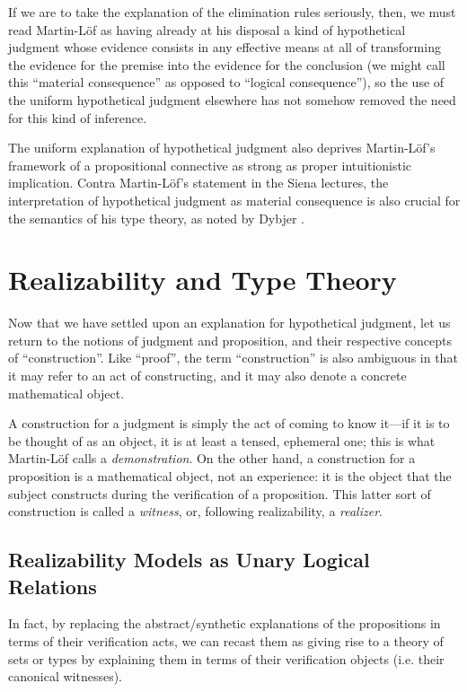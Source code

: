 \documentclass[11pt]{amsart}
\theoremstyle{definition}
\theoremstyle{remark}
\numberwithin{equation}{section}
\begin{document}
If we are to take the explanation of the elimination rules seriously, then, we
must read Martin-L\"of as having already at his disposal a kind of hypothetical
judgment whose evidence consists in any effective means at all of transforming
the evidence for the premise into the evidence for the conclusion (we might call
this ``material consequence'' as opposed to ``logical consequence''), so the use
of the uniform hypothetical judgment elsewhere has not somehow removed the need
for this kind of inference.

The uniform explanation of hypothetical judgment also deprives Martin-L\"of's
framework of a propositional connective as strong as proper intuitionistic
implication. Contra Martin-L\"of's statement in the Siena lectures, the
interpretation of hypothetical judgment as material consequence is also crucial
for the semantics of his type theory, as noted by Dybjer \cite{dybjer:testing}.

\section{Realizability and Type Theory}

Now that we have settled upon an explanation for hypothetical judgment, let us
return to the notions of judgment and proposition, and their respective concepts
of ``construction''. Like ``proof'', the term ``construction'' is also ambiguous
in that it may refer to an act of constructing, and it may also denote a
concrete mathematical object.

A construction for a judgment is simply the act of coming to know it---if it is
to be thought of as an object, it is at least a tensed, ephemeral one; this is
what Martin-L\"of calls a \emph{demonstration}. On the other hand, a
construction for a proposition is a mathematical object, not an experience: it
is the object that the subject constructs during the verification of a
proposition. This latter sort of construction is called a \emph{witness}, or,
following realizability, a \emph{realizer}.

\subsection{Realizability Models as Unary Logical Relations}

In fact, by replacing the abstract/synthetic explanations of the propositions in
terms of their verification acts, we can recast them as giving rise to a theory
of sets or types by explaining them in terms of their verification objects (i.e.
their canonical witnesses).
\end{document}
